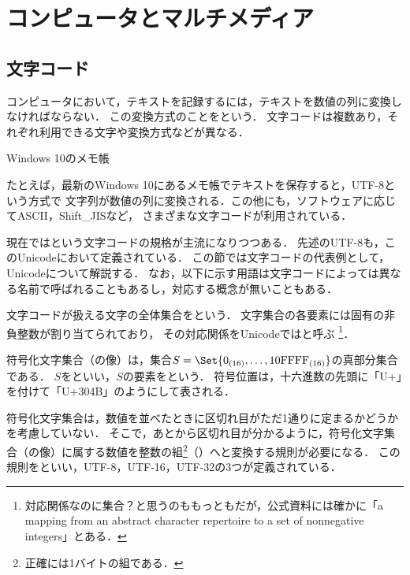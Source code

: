 \documentclass[../../index]{subfiles}
\begin{document}
\chapter{コンピュータとマルチメディア}
\section{文字コード}
コンピュータにおいて，テキストを記録するには，テキストを数値の列に変換しなければならない．
この変換方式のことをという．
文字コードは複数あり，それぞれ利用できる文字や変換方式などが異なる．

\begin{floatingfigure}{5cm}
  \centering
  \caption{Windows 10のメモ帳}
\end{floatingfigure}

たとえば，最新のWindows 10にあるメモ帳でテキストを保存すると，UTF-8という方式で
文字列が数値の列に変換される．この他にも，ソフトウェアに応じてASCII，Shift\_JISなど，
さまざまな文字コードが利用されている．

現在ではという文字コードの規格が主流になりつつある．
先述のUTF-8も，このUnicodeにおいて定義されている．
この節では文字コードの代表例として，Unicodeについて解説する．
なお，以下に示す用語は文字コードによっては異なる名前で呼ばれることもあるし，対応する概念が無いこともある．

文字コードが扱える文字の全体集合をという．
文字集合の各要素には固有の非負整数が割り当てられており，
その対応関係をUnicodeではと呼ぶ
\footnote{対応関係なのに集合？と思うのももっともだが，公式資料には確かに「a mapping from an abstract character repertoire to a set of nonnegative integers」\cite{Whistler2008}とある．}．

符号化文字集合（の像）は，集合\(S=\Set{0_{(16)},\dots,\literal{10FFFF}_{(16)}}\)の真部分集合である．
\(S\)をといい，\(S\)の要素をという．
符号位置は，十六進数の先頭に「U+」を付けて「U+304B」のようにして表される．

符号化文字集合は，数値を並べたときに区切れ目がただ1通りに定まるかどうかを考慮していない．
そこで，あとから区切れ目が分かるように，符号化文字集合（の像）に属する数値を整数の組\footnote{正確には1バイトの組である．}（）へと変換する規則が必要になる．
この規則をといい，UTF-8，UTF-16，UTF-32の3つが定義されている．
\end{document}
